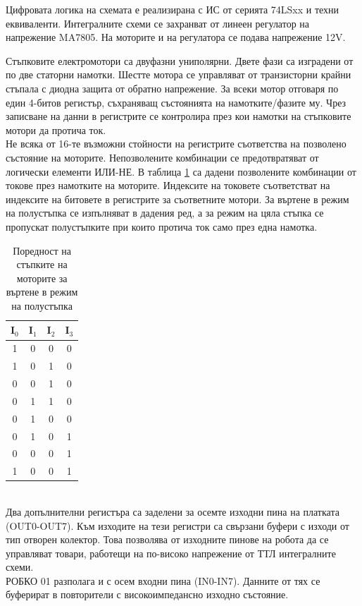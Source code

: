 Цифровата логика на схемата е реализирана с ИС от серията 74LSxx и техни еквиваленти. Интегралните схеми се захранват от линеен регулатор на напрежение MA7805. На моторите и на регулатора се подава напрежение 12V.



Стъпковите електромотори са двуфазни униполярни. Двете фази са изградени от по две статорни намотки. Шестте мотора се управляват от транзисторни крайни стъпала с диодна защита от обратно напрежение. За всеки мотор отговаря по един 4-битов регистър, съхраняващ състоянията на намотките/фазите му. Чрез записване на данни в регистрите се контролира през кои намотки на стъпковите мотори да протича ток.\\
\indent{}
Не всяка от 16-те възможни стойности на регистрите съответства на позволено състояние на моторите. Непозволените комбинации се предотвратяват от логически елементи ИЛИ-НЕ. В таблица \ref{tab:step_order} са дадени позволените комбинации от токове през намотките на моторите. Индексите на токовете съответстват на индексите на битовете в регистрите за съответните мотори. За въртене в режим на полустъпка се изпълняват в дадения ред, а за режим на цяла стъпка се пропускат  полустъпките при които протича ток само през една намотка.
\begin{table}[!htb]
    \centering
    \begin{tabular}{|c|c|c|c|}
        \hline
        I$_0$ & I$_1$ & I$_2$ & I$_3$\\
        \hline
        1 & 0 & 0 & 0\\
        \hline
        1 & 0 & 1 & 0\\
        \hline
        0 & 0 & 1 & 0\\
        \hline
        0 & 1 & 1 & 0\\
        \hline
        0 & 1 & 0 & 0\\
        \hline
        0 & 1 & 0 & 1\\
        \hline
        0 & 0 & 0 & 1\\
        \hline
        1 & 0 & 0 & 1\\
        \hline
    \end{tabular}
    \captionsetup{width=0.65\linewidth}
    \caption{Поредност на стъпките на моторите за въртене в режим на полустъпка}
    \label{tab:step_order}
\end{table}
\captionsetup{width=\linewidth}
\\
\indent{}
Два допълнителни регистъра са заделени за осемте изходни пина на платката (OUT0-OUT7). Към изходите на тези регистри са свързани буфери с изходи от тип отворен колектор. Това позволява от изходните пинове на робота да се управляват товари, работещи на по-високо напрежение от ТТЛ интегралните схеми.\\
\indent{}
РОБКО 01 разполага и с осем входни пина (IN0-IN7). Данните от тях се буферират в повторители с високоимпедансно изходно състояние.

